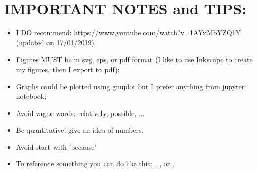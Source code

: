 \newpage\newpage
\section*{IMPORTANT NOTES and TIPS:}

\begin{itemize}
	\item I DO recommend: \url{https://www.youtube.com/watch?v=1AYxMbYZQ1Y} (updated on 17/01/2019)
	\item Figures MUST be in svg, eps, or pdf format (I like to use Inkscape to create my figures, then I export to pdf);
	\item Graphs could be plotted using gnuplot but I prefer anything from jupyter notebook; 
	\item Avoid vague words: relatively, possible, ... 
	\item Be quantitative! give an idea of numbers.
	\item Avoid start with 'because'
	\item To reference something you can do like this: \citep{justyna2015SBRC}, \citep{kerkers2014aims}, or \citet{jjsantanna2015IM2,jjsantanna2015IM1}, \citet{santanna2013aims} 

\end{itemize}

